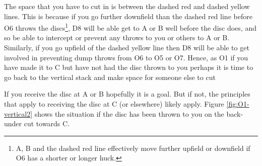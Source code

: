 \documentclass{tufte-handout}
\begin{document}
The space
that you have 
to cut in
is between 
the dashed red 
and dashed yellow lines. 
This is because if you go 
further downfield than the dashed red line 
before O6 throws the discs\footnote{
A, B 
and the dashed red line 
effectively move further upfield
or downfield
if O6 has a shorter or longer huck.},
D8 will be able 
get to
A or B 
well before the disc does, 
and so be able to intercept 
or prevent 
any throws to 
you or others
to A or B. 
Similarly, 
if you go 
upfield of the dashed yellow line
then D8 will be able 
to get involved in 
preventing dump throws from O6
to O5 
or O7.
Hence, as O1 
if you have made it to C
but have not had the disc thrown to you
perhaps it is time to go back to the vertical stack
and make space for someone else to cut

If you receive the disc at A or B hopefully it is a goal. 
But if not, the principles that apply 
to receiving the disc at C 
(or elsewhere) likely apply. Figure \ref{fig:O1-vertical2} shows 
the situation if the disc has been thrown to you
on the back-under cut towards C.
\end{document}
